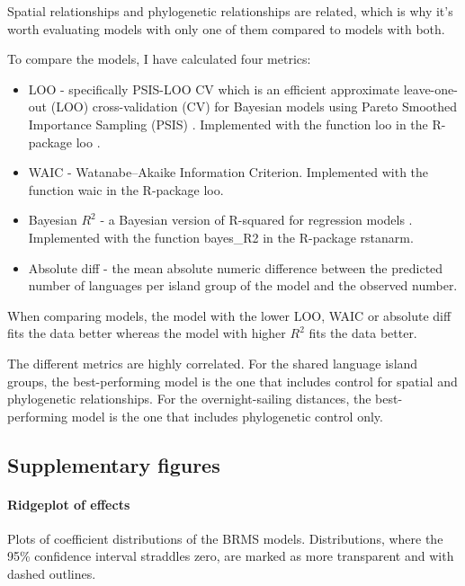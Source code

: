 \documentclass[unnumsec,webpdf,modern,medium]{oup-authoring-template}
\begin{document}
Spatial relationships and phylogenetic relationships are related, which is why it's worth evaluating models with only one of them compared to models with both.

To compare the models, I have calculated four metrics:

\begin{itemize}
    \item LOO - specifically PSIS-LOO CV which is an efficient approximate leave-one-out (LOO) cross-validation (CV) for Bayesian models using Pareto Smoothed Importance Sampling (PSIS) . Implemented with the function loo in the R-package loo \citep{R-loo, loo2017a, loo2017b}.
    \item WAIC - Watanabe–Akaike Information Criterion. Implemented with the function waic in the R-package loo.
    \item Bayesian $R^2$ - a Bayesian version of R-squared for regression models \citep{R-brms, brms2017, brms2018, brms2021}. Implemented with the function bayes\_R2 in the R-package rstanarm.
    \item Absolute diff - the mean absolute numeric difference between the predicted number of languages per island group of the model and the observed number.
\end{itemize}

When comparing models, the model with the lower LOO, WAIC or absolute diff fits the data better whereas the model with higher $R^2$ fits the data better. 





The different metrics are highly correlated. For the shared language island groups, the best-performing model is the one that includes control for spatial and phylogenetic relationships. For the overnight-sailing distances, the best-performing model is the one that includes phylogenetic control only.

\newpage
\subsection{Supplementary figures}
\label{appendix_supp_figs}

\FloatBarrier
\paragraph{Ridgeplot of effects}
\label{appendix_supp_figs_ridges}
Plots of coefficient distributions of the BRMS models. Distributions, where the 95\% confidence interval straddles zero, are marked as more transparent and with dashed outlines.
\end{document}
